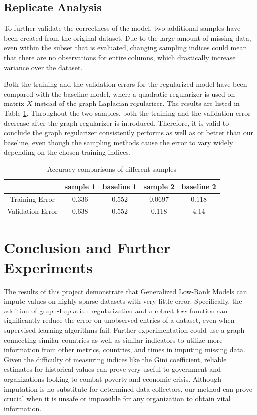 \documentclass[a4paper]{article}
\begin{document}
\subsection{Replicate Analysis }
To further validate the correctness of the model, two additional samples have been created from the original dataset. Due to the large amount of missing data, even within the subset that is evaluated, changing sampling indices could mean that there are no observations for entire columns, which drastically increase variance over the dataset. 

Both the training and the validation errors for the regularized model have been compared with the baseline model, where a quadratic regularizer is used on matrix $X$ instead of the graph Laplacian regularizer. The results are listed in Table \ref{tab:compare}. Throughout the two samples, both the training and the validation error decrease after the graph regularizer is introduced. Therefore, it is valid to conclude the graph regularizer consistently performs as well as or better than our baseline, even though the sampling methods cause the error to vary widely depending on the chosen training indices.

\begin{table}
\centering
\begin{tabular}{|c|c|c|c|c|}
\hline
 & sample 1 & baseline 1 & sample 2 & baseline 2\\\hline
Training Error & 0.336 & 0.552 & 0.0697 & 0.118\\
Validation Error & 0.638 & 0.552 & 0.118 &4.14
\end{tabular}
\caption{Accuracy comparisons of different samples}
\label{tab:compare}
\end{table}
\section{Conclusion and Further Experiments}
The results of this project demonstrate that Generalized Low-Rank Models can impute values on highly sparse datasets with very little error. Specifically, the addition of graph-Laplacian regularization and a robust loss function can significantly reduce the error on unobserved entries of a dataset, even when supervised learning algorithms fail. Further experimentation could use a graph connecting similar countries as well as similar indicators to utilize more information from other metrics, countries, and times in imputing missing data. Given the difficulty of measuring indices like the Gini coefficient, reliable estimates for historical values can prove very useful to government and organizations looking to combat poverty and economic crisis. Although imputation is no substitute for determined data collectors, our method can prove crucial when it is unsafe or impossible for any organization to obtain vital information.
\end{document}
